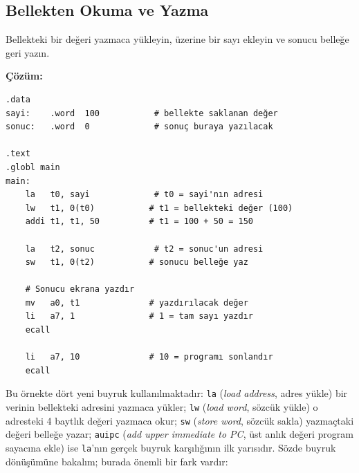 \subsection{Bellekten Okuma ve Yazma}
\label{subsec:bellekten-okuma-yazma}

\begin{ornek}[4.2]
\label{orn:bellek-oku-yaz}
Bellekteki bir değeri yazmaca yükleyin, üzerine bir sayı ekleyin ve sonucu belleğe geri yazın.

\textbf{Çözüm:}

\begin{lstlisting}[style=riscv]
.data
sayi:    .word  100           # bellekte saklanan değer
sonuc:   .word  0             # sonuç buraya yazılacak

.text
.globl main
main:
    la   t0, sayi             # t0 = sayi'nın adresi
    lw   t1, 0(t0)           # t1 = bellekteki değer (100)
    addi t1, t1, 50          # t1 = 100 + 50 = 150

    la   t2, sonuc            # t2 = sonuc'un adresi
    sw   t1, 0(t2)           # sonucu belleğe yaz

    # Sonucu ekrana yazdır
    mv   a0, t1              # yazdırılacak değer
    li   a7, 1               # 1 = tam sayı yazdır
    ecall

    li   a7, 10              # 10 = programı sonlandır
    ecall
\end{lstlisting}

Bu örnekte dört yeni buyruk kullanılmaktadır: \texttt{la} (\emph{load address}, adres yükle) bir verinin bellekteki adresini yazmaca yükler; \texttt{lw} (\emph{load word}, sözcük yükle) o adresteki 4 baytlık değeri yazmaca okur; \texttt{sw} (\emph{store word}, sözcük sakla) yazmaçtaki değeri belleğe yazar; \texttt{auipc} (\emph{add upper immediate to PC}, üst anlık değeri program sayacına ekle) ise \texttt{la}'nın gerçek buyruk karşılığının ilk yarısıdır. Sözde buyruk dönüşümüne bakalım; burada önemli bir fark vardır:


\end{ornek}
